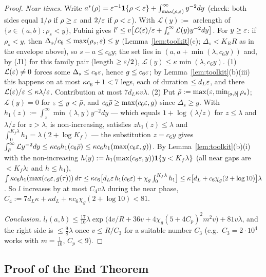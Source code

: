\begin{proof}
\emph{Near times.} Write $a^*(\rho)=\varepsilon^{-1}\mathbf{1}\{\rho<\varepsilon\}+\int_{\max(\rho,\varepsilon)}^\infty y^{-2}dy$ (check: both
sides equal $1/\rho$ if $\rho\ge\varepsilon$ and $2/\varepsilon$ if $\rho<\varepsilon$). With $\mathcal L(y):=$ arclength of
$\{s\in(a,b):\rho_s<y\}$, Fubini gives $l'\le v\bigl[\mathcal L(\varepsilon)/\varepsilon+\int_\varepsilon^\infty\mathcal L(y)y^{-2}dy\bigr]$.
For $y\ge\varepsilon$: if $\rho_s<y$, then $\Delta_s/c_6\le\max(\rho_s,\varepsilon)\le y$ (Lemma~\ref{lem:toolkit}(c); $\Delta_s<K_RR$ as in the
envelope above), so $s-a\le c_6y$; the set lies in $(a,a+\min(\lambda,c_6y))$ and, by (J1) for this family pair
(length $\ge\varepsilon/2$), $\mathcal L(y)\le\kappa\min(\lambda,c_6y)$.
(1) $\mathcal L(\varepsilon)\ne0$ forces some $\Delta_s\le c_6\varepsilon$, hence $g\le c_6\varepsilon$; by Lemma~\ref{lem:toolkit}(b)(iii) this
happens on at most $\kappa c_6+1<7$ legs, each of duration $\le d_L\varepsilon$, and there $\mathcal L(\varepsilon)/\varepsilon\le\kappa\lambda/\varepsilon$.
Contribution at most $7d_L\kappa v\lambda$.
(2) Put $\bar\rho:=\max(\varepsilon,\min_{[a,b]}\rho_s)$; $\mathcal L(y)=0$ for $\varepsilon\le y<\bar\rho$, and
$c_6\bar\rho\ge\max(c_6\varepsilon,g)$ since $\Delta_s\ge g$. With $h_1(z):=\int_z^\infty\min(\lambda,y)y^{-2}dy$ --- which equals
$1+\log(\lambda/z)$ for $z\le\lambda$ and $\lambda/z$ for $z>\lambda$, is non-increasing, satisfies $zh_1(z)\le\lambda$
and $\int_0^{K_f\lambda}h_1=\lambda(2+\log K_f)$ --- the substitution $z=c_6y$ gives
$\int_{\bar\rho}^\infty\mathcal L y^{-2}dy\le\kappa c_6h_1(c_6\bar\rho)\le\kappa c_6h_1(\max(c_6\varepsilon,g))$. By
Lemma~\ref{lem:toolkit}(b)(i) with the non-increasing $h(y):=h_1(\max(c_6\varepsilon,y))\mathbf{1}\{y<K_f\lambda\}$ (all near gaps are $<K_f\lambda$; and $h\le h_1$),
$\int\kappa c_6h_1(\max(c_6\varepsilon,g(\tau)))\,d\tau\le\kappa c_6\bigl[d_L\varepsilon\,h_1(c_6\varepsilon)+\chi_g\int_0^{K_f\lambda}h_1\bigr]
\le\kappa\bigl[d_L+c_6\chi_g(2+\log10)\bigr]\lambda$.
So $l$ increases by at most $C_4v\lambda$ during the near phase, $C_4:=7d_L\kappa+\kappa d_L+\kappa c_6\chi_g(2+\log10)<81$.

\emph{Conclusion.} $l_t(a,b)\le\frac{17}{16}\lambda\exp\bigl(4v/R+36v+4\chi_g(5+4C_p)^2m^2v\bigr)+81v\lambda$, and the
right side is $\le\frac98\lambda$ once $v\le R/C_3$ for a suitable number $C_3$ (e.g.\ $C_3=2\cdot10^4$ works with
$m=\frac1{10}$, $C_p<9$).
\end{proof}

\subsection{Proof of the End Theorem}\label{app:walk:proof}


